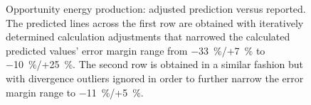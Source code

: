 \begin{figure}[h]
\begin{subfigure}[t]{\subfigureWidth}
		\label{fig:plot:sub:mer-energy-production-predicted-vs-reported-my32-adjusted-without-outliers}
	\end{subfigure}
    \caption[Opportunity energy production: adjusted prediction versus reported]
            {Opportunity energy production: adjusted prediction versus reported. The predicted lines across the first row are obtained with iteratively determined calculation adjustments that narrowed the calculated predicted values' error margin range from \SI{-33}{\percent}/+\SI{7}{\percent} to \SI{-10}{\percent}/+\SI{25}{\percent}. The second row is obtained in a similar fashion but with divergence outliers ignored in order to further narrow the error margin range to \SI{-11}{\percent}/+\SI{5}{\percent}.}
    \label{fig:plot:mer-energy-production-predicted-vs-reported-adjusted-with-and-without-outliers}
\vspace{-2ex}
\end{figure}

\clearpage


